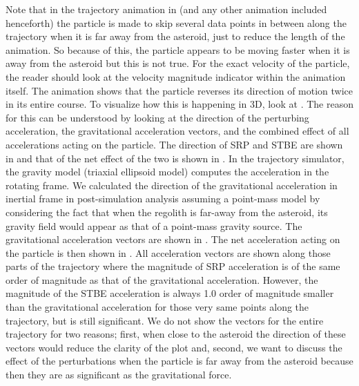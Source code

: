 \FloatBarrier
Note that in the trajectory animation in  (and any other animation included henceforth) the particle is made to skip several data points in between along the trajectory when it is far away from the asteroid, just to reduce the length of the animation. So because of this, the particle appears to be moving faster when it is away from the asteroid but this is not true. For the exact velocity of the particle, the reader should look at the velocity magnitude indicator within the animation itself.
%
\newline\newline
%
The animation shows that the particle reverses its direction of motion twice in its entire course. To visualize how this is happening in 3D, look at . The reason for this can be understood by looking at the direction of the perturbing acceleration, the gravitational acceleration vectors, and the combined effect of all accelerations acting on the particle. The direction of \gls{SRP} and \gls{STBE} are shown in  and that of the net effect of the two is shown in . In the trajectory simulator, the gravity model (triaxial ellipsoid model) computes the acceleration in the rotating frame. We calculated the direction of the gravitational acceleration in inertial frame in post-simulation analysis assuming a point-mass model by considering the fact that when the regolith is far-away from the asteroid, its gravity field would appear as that of a point-mass gravity source. The gravitational acceleration vectors are shown in . The net acceleration acting on the particle is then shown in . All acceleration vectors are shown along those parts of the trajectory where the magnitude of \gls{SRP} acceleration is of the same order of magnitude as that of the gravitational acceleration. However, the magnitude of the \gls{STBE} acceleration is always 1.0 order of magnitude smaller than the gravitational acceleration for those very same points along the trajectory, but is still significant. We do not show the vectors for the entire trajectory for two reasons; first, when close to the asteroid the direction of these vectors would reduce the clarity of the plot and,  second, we want to discuss the effect of the perturbations when the particle is far away from the asteroid because then they are as significant as the gravitational force.
